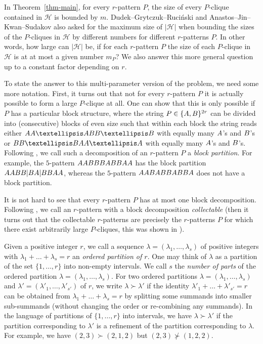 \documentclass[11pt]{article}
\theoremstyle{definition}
\numberwithin{equation}{section}
\numberwithin{figure}{section}
\newcommand{\HH}{\mathcal{H}}
\begin{document}
In Theorem~\ref{thm-main}, for every $r$-pattern $P$, the size of every $P$-clique contained in $\HH$ is bounded by $m$. Dudek--Grytczuk--Ruci\'{n}ski and Anastos--Jin--Kwan--Sudakov also asked for the maximum size of $|\HH|$ when bounding the sizes of the $P$-cliques in $\HH$ by different numbers for different $r$-patterns $P$. In other words, how large can $|\HH|$ be, if for each $r$-pattern $P$ the size of each $P$-clique in $\HH$ is at at most a given number $m_P$? We also answer this more general question up to a constant factor depending on $r$.

To state the answer to this multi-parameter version of the problem, we need some more notation. First, it turns out that not for every $r$-pattern $P$ it is actually possible to form a large $P$-clique at all. One can show that this is only possible if $P$ has a particular block structure, where the string $P\in\{{\rm A},{\rm B}\}^{2r}$ can be divided into (consecutive) blocks of even size such that within each block the string reads either $\rm{AA}\dots\rm{A}\rm {BB}\dots\rm{B}$ with equally many $\rm{A}$'s and $\rm{B}$'s or $\rm{BB}\dots\rm{B}\rm {AA}\dots\rm{A}$ with equally many $\rm{A}$'s and $\rm{B}$'s. Following \cite{AJKS}, we call such a decomposition of an $r$-pattern $P$ a \emph{block partition}. For example, the $5$-pattern $\rm{AABBBABBAA}$ has the block partition $\rm{AABB|BA|BBAA}$, whereas the $5$-pattern $\rm{AABABBABBA}$ does not have a block partition.

It is not hard to see that every $r$-pattern $P$ has at most one block decomposition. Following \cite{DGR}, we call an $r$-pattern with a block decomposition \emph{collectable} (then it turns out that the collectable $r$-patterns are precisely the $r$-patterns $P$ for which there exist arbitrarily large $P$-cliques, this was shown in \cite{DGR}).

Given a positive integer $r$, we call a sequence $\lambda=(\lambda_1,\dots,\lambda_s)$ of positive integers with $\lambda_1+\dots+\lambda_s=r$ an \emph{ordered partition of $r$}. One may think of $\lambda$ as a partition of the set $\{1,\dots,r\}$ into non-empty intervals. We call $s$ the \emph{number of parts} of the ordered partition $\lambda=(\lambda_1,\dots,\lambda_s)$. For two ordered partitions $\lambda=(\lambda_1,\dots,\lambda_s)$ and $\lambda'=(\lambda'_1,\dots,\lambda'_{s'})$ of $r$, we write $\lambda \succ \lambda'$ if the identity $\lambda'_1+\dots+\lambda'_{s'}=r$ can be obtained from $\lambda_1+\dots+\lambda_s=r$ by splitting some summands into smaller sub-summands (without changing the order or re-combining any summands). In the language of partitions of $\{1,\dots,r\}$ into intervals, we have $\lambda \succ \lambda'$ if the partition corresponding to $\lambda'$ is a refinement of the partition corresponding to $\lambda$. For example, we have $(2,3) \succ (2,1,2)$ but $(2,3) \not\succ (1,2,2)$.
\end{document}
